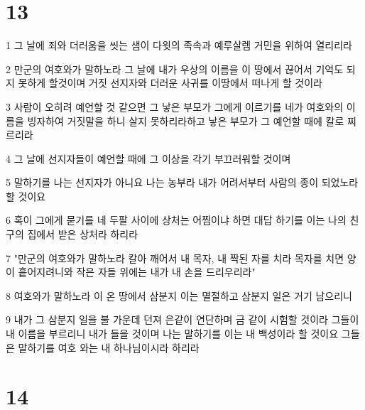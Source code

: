 \chapter{13}

\par 1 그 날에 죄와 더러움을 씻는 샘이 다윗의 족속과 예루살렘 거민을 위하여 열리리라
\par 2 만군의 여호와가 말하노라 그 날에 내가 우상의 이름을 이 땅에서 끊어서 기억도 되지 못하게 할것이며 거짓 선지자와 더러운 사귀를 이땅에서 떠나게 할 것이라
\par 3 사람이 오히려 예언할 것 같으면 그 낳은 부모가 그에게 이르기를 네가 여호와의 이름을 빙자하여 거짓말을 하니 살지 못하리라하고 낳은 부모가 그 예언할 때에 칼로 찌르리라
\par 4 그 날에 선지자들이 예언할 때에 그 이상을 각기 부끄러워할 것이며
\par 5 말하기를 나는 선지자가 아니요 나는 농부라 내가 어려서부터 사람의 종이 되었노라 할 것이요
\par 6 혹이 그에게 묻기를 네 두팔 사이에 상처는 어찜이냐 하면 대답 하기를 이는 나의 친구의 집에서 받은 상처라 하리라
\par 7 "만군의 여호와가 말하노라 칼아 깨어서 내 목자, 내 짝된 자를 치라 목자를 치면 양이 흩어지려니와 작은 자들 위에는 내가 내 손을 드리우리라"
\par 8 여호와가 말하노라 이 온 땅에서 삼분지 이는 멸절하고 삼분지 일은 거기 남으리니
\par 9 내가 그 삼분지 일을 불 가운데 던져 은같이 연단하며 금 같이 시험할 것이라 그들이 내 이름을 부르리니 내가 들을 것이며 나는 말하기를 이는 내 백성이라 할 것이요 그들은 말하기를 여호 와는 내 하나님이시라 하리라

\chapter{14}

